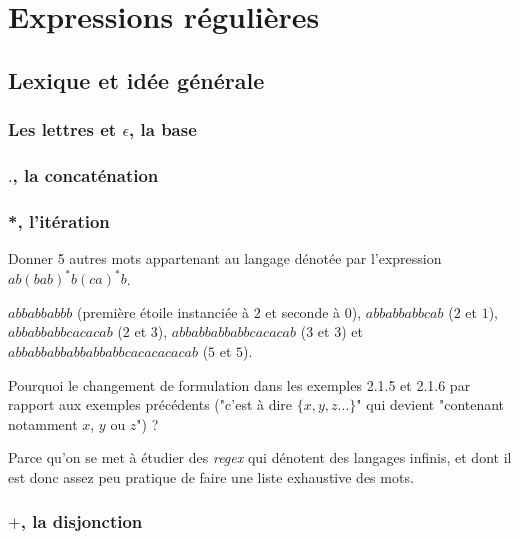 \chapter{Expressions régulières}
\label{regex}

\section{Lexique et idée générale}

\subsection{Les lettres et $\epsilon$, la base}

\subsection{$.$, la concaténation}

\subsection{*, l'itération}

\begin{exercice}
Donner 5 autres mots appartenant au langage dénotée par l'expression $ab(bab)^*b(ca)^*b$.
\end{exercice}

\begin{correction*}
$abbabbabbb$ (première étoile instanciée à $2$ et seconde à $0$),
$abbabbabbcab$ ($2$ et $1$), $abbabbabbcacacab$ ($2$ et $3$), $abbabbabbabbcacacab$ ($3$ et $3$) et $abbabbabbabbabbabbcacacacacab$ ($5$ et $5$). 
\end{correction*}

\begin{exercice}
Pourquoi le changement de formulation dans les exemples 2.1.5 et 2.1.6 par rapport aux exemples précédents ("c'est à dire $\{x, y, z ... \}$" qui devient "contenant notamment $x$, $y$ ou $z$") ?
\end{exercice}

\begin{correction*}
Parce qu'on se met à étudier des \textit{regex} qui dénotent des langages infinis, et dont il est donc assez peu pratique de faire une liste exhaustive des mots.
\end{correction*}

\subsection{$+$, la disjonction}

